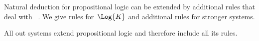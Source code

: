 \documentclass[../../../include/open-logic-section]{subfiles}
\begin{document}


Natural deduction for propositional logic can be extended by
additional rules that deal
with~%
. We give rules for~$\Log{K}$ and
additional rules for stronger systems.

All out systems extend propositional logic and therefore include
all its rules. 
\end{document}
